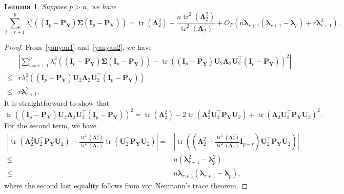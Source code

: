 \documentclass[12pt]{article} %
\DeclareMathOperator{\mytr}{tr}
\newcommand{\bP}{\mathbf{P}}
\newcommand{\bY}{\mathbf{Y}}
\newcommand{\bI}{\mathbf{I}}
\newcommand{\bU}{\mathbf{U}}
\newcommand{\bfsym}[1]{\ensuremath{\boldsymbol{#1}}}
\def\blambda {\bfsym {\lambda}}
\def\bLambda {\bfsym {\Lambda}}
\def\bSigma {\bfsym {\Sigma}}
\newtheorem{lemma}{Lemma}
\theoremstyle{definition}
\begin{document}
\begin{appendices}
\begin{lemma}\label{gg:Lemma2}
    Suppose $p>n$, we have
    \begin{equation}\label{eq:spiketrace1}
        \sum_{i=r+1}^{p}\lambda_i^2\left(
         (\bI_p -\bP_\bY)\bSigma (\bI_p- \bP_{\bY})
    \right)
        =
    \mytr(\bLambda_2^2)-\frac{n\mytr^2(\bLambda_2^2)}{\mytr^2(\bLambda_2)}
 +
O_P\left(n\blambda_{r+1}(\blambda_{r+1}-\blambda_p)+r \blambda_{r+1}^2\right).
    \end{equation}
\end{lemma}
\begin{proof}
    From~\eqref{yanyan1} and~\eqref{yanyan2}, we have
    \begin{equation}\label{jojo100}
        \begin{split}
        &\left|
        \sum_{i=r+1}^{p}\lambda_i^2\left(
         (\bI_p -\bP_\bY)\bSigma (\bI_p- \bP_{\bY})
    \right)
    -
        \mytr\left(
         (\bI_p -\bP_\bY)\bU_2 \bLambda_2 \bU_2^\top (\bI_p- \bP_{\bY})
    \right)^2
    \right|
    \\
    \leq&
    r\lambda_1^2 \left(
         (\bI_p -\bP_\bY)\bU_2 \bLambda_2 \bU_2^\top (\bI_p- \bP_{\bY})
    \right)
    \\
    \leq & r \blambda_{r+1}^2.
        \end{split}
    \end{equation}
    It is straightforward to show that
    \begin{equation*}
        \mytr\left(
         (\bI_p -\bP_\bY)\bU_2 \bLambda_2 \bU_2^\top (\bI_p- \bP_{\bY})
    \right)^2
    =
    \mytr(\bLambda_2^2)
    -2\mytr(\bLambda_2^2 \bU_2^\top \bP_\bY \bU_2)
    + \mytr(\bLambda_2 \bU_2^\top \bP_\bY \bU_2)^2.
    \end{equation*}
    For the second term, we have
    \begin{equation*}
        \begin{split}
        \left|
 \mytr(\bLambda_2^2 \bU_2^\top \bP_\bY \bU_2)
 -
 \frac{\mytr^2(\bLambda_2^2)}{\mytr^2(\bLambda_2)}\mytr( \bU_2^\top \bP_\bY \bU_2)
 \right|
        =&\left|
        \mytr\left(\left(\bLambda_2^2-\frac{\mytr^2(\bLambda_2^2)}{\mytr^2(\bLambda_2)}\bI_{p-r}\right)  \bU_2^\top \bP_\bY \bU_2\right)
 \right|
 \\
 \leq & n(\blambda_{r+1}^2-\blambda_p^2)\\
 \leq &
 n\blambda_{r+1}(\blambda_{r+1}-\blambda_p),
        \end{split}
    \end{equation*}
    where the second last equality follows from von Neumann's trace theorem.

\end{proof}
\end{appendices}
\end{document}
